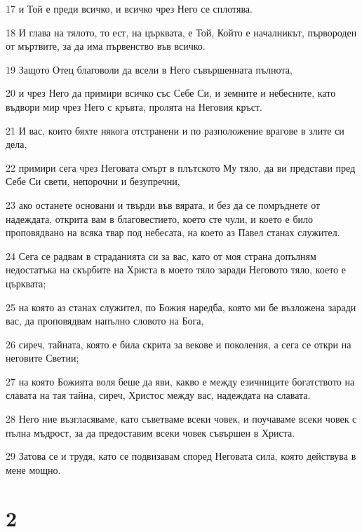 \par 17 и Той е преди всичко, и всичко чрез Него се сплотява.
\par 18 И глава на тялото, то ест, на църквата, е Той, Който е началникът, първороден от мъртвите, за да има първенство във всичко.
\par 19 Защото Отец благоволи да всели в Него съвършенната пълнота,
\par 20 и чрез Него да примири всичко със Себе Си, и земните и небесните, като въдвори мир чрез Него с кръвта, пролята на Неговия кръст.
\par 21 И вас, които бяхте някога отстранени и по разположение врагове в злите си дела,
\par 22 примири сега чрез Неговата смърт в плътското Му тяло, да ви представи пред Себе Си свети, непорочни и безупречни,
\par 23 ако останете основани и твърди във вярата, и без да се помръднете от надеждата, открита вам в благовестието, което сте чули, и което е било проповядвано на всяка твар под небесата, на което аз Павел станах служител.
\par 24 Сега се радвам в страданията си за вас, като от моя страна допълням недостатъка на скърбите на Христа в моето тяло заради Неговото тяло, което е църквата;
\par 25 на която аз станах служител, по Божия наредба, която ми бе възложена заради вас, да проповядвам напълно словото на Бога,
\par 26 сиреч, тайната, която е била скрита за векове и поколения, а сега се откри на неговите Светии;
\par 27 на която Божията воля беше да яви, какво е между езичниците богатството на славата на тая тайна, сиреч, Христос между вас, надеждата на славата.
\par 28 Него ние възгласяваме, като съветваме всеки човек, и поучаваме всеки човек с пълна мъдрост, за да предоставим всеки човек съвършен в Христа.
\par 29 Затова се и трудя, като се подвизавам според Неговата сила, която действува в мене мощно.

\chapter{2}

